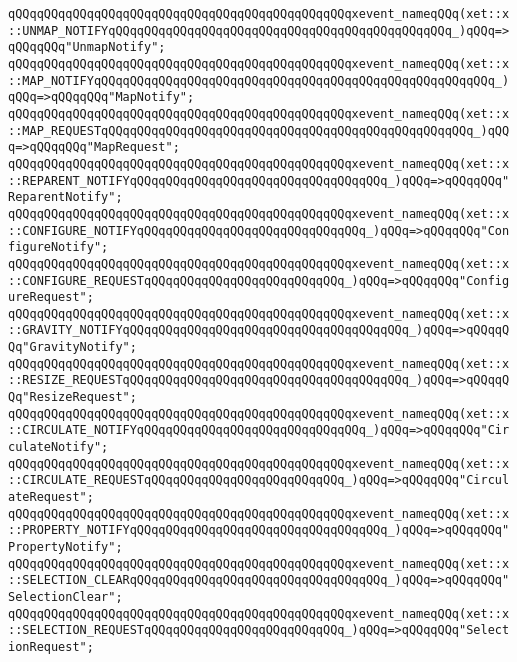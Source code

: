 \verb|qQQqqQQqqQQqqQQqqQQqqQQqqQQqqQQqqQQqqQQqqQQqqQQqxevent_nameqQQq(xet::x::UNMAP_NOTIFYqQQqqQQqqQQqqQQqqQQqqQQqqQQqqQQqqQQqqQQqqQQqqQQq_)qQQq=>qQQqqQQq"UnmapNotify";|\newline
\verb|qQQqqQQqqQQqqQQqqQQqqQQqqQQqqQQqqQQqqQQqqQQqqQQqxevent_nameqQQq(xet::x::MAP_NOTIFYqQQqqQQqqQQqqQQqqQQqqQQqqQQqqQQqqQQqqQQqqQQqqQQqqQQqqQQq_)qQQq=>qQQqqQQq"MapNotify";|\newline
\verb|qQQqqQQqqQQqqQQqqQQqqQQqqQQqqQQqqQQqqQQqqQQqqQQqxevent_nameqQQq(xet::x::MAP_REQUESTqQQqqQQqqQQqqQQqqQQqqQQqqQQqqQQqqQQqqQQqqQQqqQQqqQQq_)qQQq=>qQQqqQQq"MapRequest";|\newline
\verb|qQQqqQQqqQQqqQQqqQQqqQQqqQQqqQQqqQQqqQQqqQQqqQQqxevent_nameqQQq(xet::x::REPARENT_NOTIFYqQQqqQQqqQQqqQQqqQQqqQQqqQQqqQQqqQQq_)qQQq=>qQQqqQQq"ReparentNotify";|\newline
\verb|qQQqqQQqqQQqqQQqqQQqqQQqqQQqqQQqqQQqqQQqqQQqqQQqxevent_nameqQQq(xet::x::CONFIGURE_NOTIFYqQQqqQQqqQQqqQQqqQQqqQQqqQQqqQQq_)qQQq=>qQQqqQQq"ConfigureNotify";|\newline
\verb|qQQqqQQqqQQqqQQqqQQqqQQqqQQqqQQqqQQqqQQqqQQqqQQqxevent_nameqQQq(xet::x::CONFIGURE_REQUESTqQQqqQQqqQQqqQQqqQQqqQQqqQQq_)qQQq=>qQQqqQQq"ConfigureRequest";|\newline
\verb|qQQqqQQqqQQqqQQqqQQqqQQqqQQqqQQqqQQqqQQqqQQqqQQqxevent_nameqQQq(xet::x::GRAVITY_NOTIFYqQQqqQQqqQQqqQQqqQQqqQQqqQQqqQQqqQQqqQQq_)qQQq=>qQQqqQQq"GravityNotify";|\newline
\verb|qQQqqQQqqQQqqQQqqQQqqQQqqQQqqQQqqQQqqQQqqQQqqQQqxevent_nameqQQq(xet::x::RESIZE_REQUESTqQQqqQQqqQQqqQQqqQQqqQQqqQQqqQQqqQQqqQQq_)qQQq=>qQQqqQQq"ResizeRequest";|\newline
\verb|qQQqqQQqqQQqqQQqqQQqqQQqqQQqqQQqqQQqqQQqqQQqqQQqxevent_nameqQQq(xet::x::CIRCULATE_NOTIFYqQQqqQQqqQQqqQQqqQQqqQQqqQQqqQQq_)qQQq=>qQQqqQQq"CirculateNotify";|\newline
\verb|qQQqqQQqqQQqqQQqqQQqqQQqqQQqqQQqqQQqqQQqqQQqqQQqxevent_nameqQQq(xet::x::CIRCULATE_REQUESTqQQqqQQqqQQqqQQqqQQqqQQqqQQq_)qQQq=>qQQqqQQq"CirculateRequest";|\newline
\verb|qQQqqQQqqQQqqQQqqQQqqQQqqQQqqQQqqQQqqQQqqQQqqQQqxevent_nameqQQq(xet::x::PROPERTY_NOTIFYqQQqqQQqqQQqqQQqqQQqqQQqqQQqqQQqqQQq_)qQQq=>qQQqqQQq"PropertyNotify";|\newline
\verb|qQQqqQQqqQQqqQQqqQQqqQQqqQQqqQQqqQQqqQQqqQQqqQQqxevent_nameqQQq(xet::x::SELECTION_CLEARqQQqqQQqqQQqqQQqqQQqqQQqqQQqqQQqqQQq_)qQQq=>qQQqqQQq"SelectionClear";|\newline
\verb|qQQqqQQqqQQqqQQqqQQqqQQqqQQqqQQqqQQqqQQqqQQqqQQqxevent_nameqQQq(xet::x::SELECTION_REQUESTqQQqqQQqqQQqqQQqqQQqqQQqqQQq_)qQQq=>qQQqqQQq"SelectionRequest";|\newline
